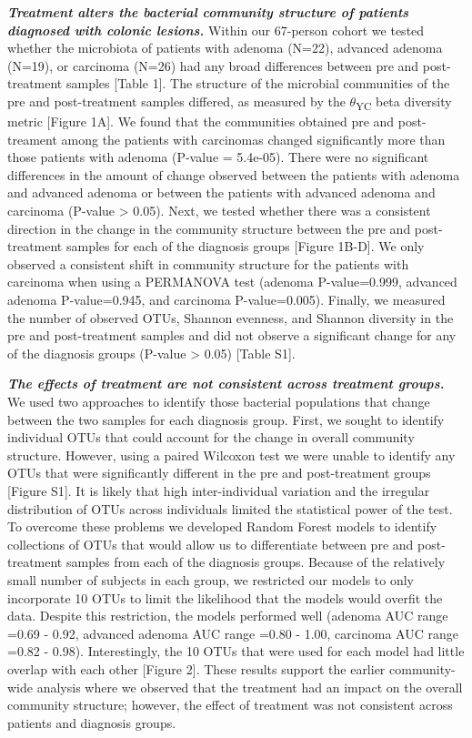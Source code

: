 \documentclass[12pt,]{article}
\begin{document}
\textbf{\emph{Treatment alters the bacterial community structure of
patients diagnosed with colonic lesions.}} Within our 67-person cohort
we tested whether the microbiota of patients with adenoma (N=22),
advanced adenoma (N=19), or carcinoma (N=26) had any broad differences
between pre and post-treatment samples {[}Table 1{]}. The structure of
the microbial communities of the pre and post-treatment samples
differed, as measured by the \(\theta\)\textsubscript{YC} beta diversity
metric {[}Figure 1A{]}. We found that the communities obtained pre and
post-treament among the patients with carcinomas changed significantly
more than those patients with adenoma (P-value = 5.4e-05). There were no
significant differences in the amount of change observed between the
patients with adenoma and advanced adenoma or between the patients with
advanced adenoma and carcinoma (P-value \textgreater{} 0.05). Next, we
tested whether there was a consistent direction in the change in the
community structure between the pre and post-treatment samples for each
of the diagnosis groups {[}Figure 1B-D{]}. We only observed a consistent
shift in community structure for the patients with carcinoma when using
a PERMANOVA test (adenoma P-value=0.999, advanced adenoma P-value=0.945,
and carcinoma P-value=0.005). Finally, we measured the number of
observed OTUs, Shannon evenness, and Shannon diversity in the pre and
post-treatment samples and did not observe a significant change for any
of the diagnosis groups (P-value \textgreater{} 0.05) {[}Table S1{]}.

\textbf{\emph{The effects of treatment are not consistent across
treatment groups.}} We used two approaches to identify those bacterial
populations that change between the two samples for each diagnosis
group. First, we sought to identify individual OTUs that could account
for the change in overall community structure. However, using a paired
Wilcoxon test we were unable to identify any OTUs that were
significantly different in the pre and post-treatment groups {[}Figure
S1{]}. It is likely that high inter-individual variation and the
irregular distribution of OTUs across individuals limited the
statistical power of the test. To overcome these problems we developed
Random Forest models to identify collections of OTUs that would allow us
to differentiate between pre and post-treatment samples from each of the
diagnosis groups. Because of the relatively small number of subjects in
each group, we restricted our models to only incorporate 10 OTUs to
limit the likelihood that the models would overfit the data. Despite
this restriction, the models performed well (adenoma AUC range =0.69 -
0.92, advanced adenoma AUC range =0.80 - 1.00, carcinoma AUC range =0.82
- 0.98). Interestingly, the 10 OTUs that were used for each model had
little overlap with each other {[}Figure 2{]}. These results support the
earlier community-wide analysis where we observed that the treatment had
an impact on the overall community structure; however, the effect of
treatment was not consistent across patients and diagnosis groups.
\end{document}
